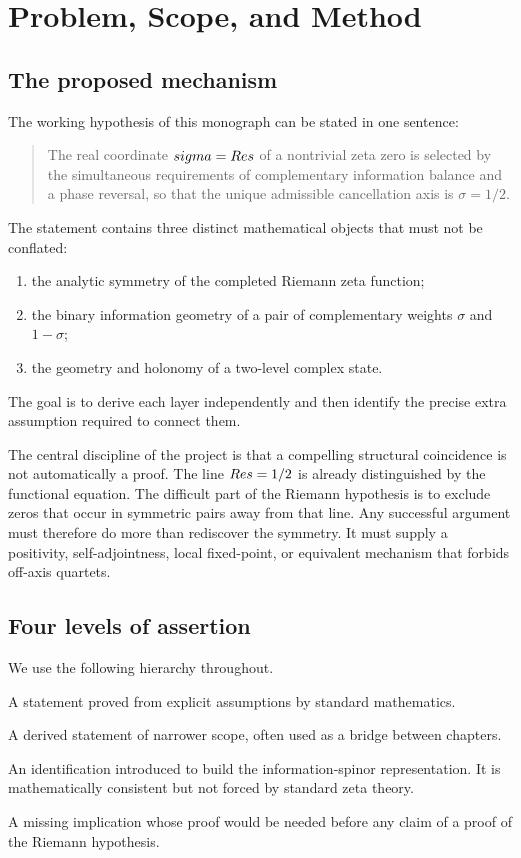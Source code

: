 \chapter{Problem, Scope, and Method}
\label{ch:problem}

\section{The proposed mechanism}
The working hypothesis of this monograph can be stated in one sentence:

\begin{quote}
The real coordinate $sigma=Re s$ of a nontrivial zeta zero is selected by the simultaneous requirements of complementary information balance and a phase reversal, so that the unique admissible cancellation axis is $\sigma=1/2$.
\end{quote}

The statement contains three distinct mathematical objects that must not be conflated:
\begin{enumerate}[label=(\roman*)]
\item the analytic symmetry of the completed Riemann zeta function;
\item the binary information geometry of a pair of complementary weights $\sigma$ and $1-\sigma$;
\item the geometry and holonomy of a two-level complex state.
\end{enumerate}
The goal is to derive each layer independently and then identify the precise extra assumption required to connect them.

The central discipline of the project is that a compelling structural coincidence is not automatically a proof. The line $Re s=1/2$ is already distinguished by the functional equation. The difficult part of the Riemann hypothesis is to exclude zeros that occur in symmetric pairs away from that line. Any successful argument must therefore do more than rediscover the symmetry. It must supply a positivity, self-adjointness, local fixed-point, or equivalent mechanism that forbids off-axis quartets.

\section{Four levels of assertion}
We use the following hierarchy throughout.

\begin{description}[style=nextline]
\item[THEOREM] A statement proved from explicit assumptions by standard mathematics.
\item[PROPOSITION] A derived statement of narrower scope, often used as a bridge between chapters.
\item[MODEL POSTULATE] An identification introduced to build the information-spinor representation. It is mathematically consistent but not forced by standard zeta theory.
\item[OPEN GAP] A missing implication whose proof would be needed before any claim of a proof of the Riemann hypothesis.
\end{description}

